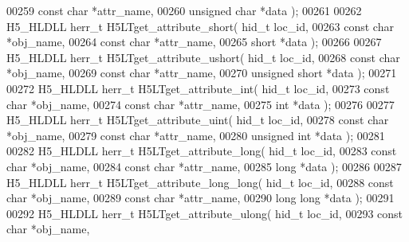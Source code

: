 \begin{DoxyCode}
00259                                \textcolor{keyword}{const} \textcolor{keywordtype}{char} *attr\_name,
00260                                \textcolor{keywordtype}{unsigned} \textcolor{keywordtype}{char} *data );
00261 
00262 H5\_HLDLL herr\_t  H5LTget\_attribute\_short( hid\_t loc\_id,
00263                                 \textcolor{keyword}{const} \textcolor{keywordtype}{char} *obj\_name,
00264                                 \textcolor{keyword}{const} \textcolor{keywordtype}{char} *attr\_name,
00265                                 \textcolor{keywordtype}{short} *data );
00266 
00267 H5\_HLDLL herr\_t  H5LTget\_attribute\_ushort( hid\_t loc\_id,
00268                                 \textcolor{keyword}{const} \textcolor{keywordtype}{char} *obj\_name,
00269                                 \textcolor{keyword}{const} \textcolor{keywordtype}{char} *attr\_name,
00270                                 \textcolor{keywordtype}{unsigned} \textcolor{keywordtype}{short} *data );
00271 
00272 H5\_HLDLL herr\_t  H5LTget\_attribute\_int( hid\_t loc\_id,
00273                               \textcolor{keyword}{const} \textcolor{keywordtype}{char} *obj\_name,
00274                               \textcolor{keyword}{const} \textcolor{keywordtype}{char} *attr\_name,
00275                               \textcolor{keywordtype}{int} *data );
00276 
00277 H5\_HLDLL herr\_t  H5LTget\_attribute\_uint( hid\_t loc\_id,
00278                               \textcolor{keyword}{const} \textcolor{keywordtype}{char} *obj\_name,
00279                               \textcolor{keyword}{const} \textcolor{keywordtype}{char} *attr\_name,
00280                               \textcolor{keywordtype}{unsigned} \textcolor{keywordtype}{int} *data );
00281 
00282 H5\_HLDLL herr\_t  H5LTget\_attribute\_long( hid\_t loc\_id,
00283                                \textcolor{keyword}{const} \textcolor{keywordtype}{char} *obj\_name,
00284                                \textcolor{keyword}{const} \textcolor{keywordtype}{char} *attr\_name,
00285                                \textcolor{keywordtype}{long} *data );
00286 
00287 H5\_HLDLL herr\_t  H5LTget\_attribute\_long\_long( hid\_t loc\_id,
00288                                \textcolor{keyword}{const} \textcolor{keywordtype}{char} *obj\_name,
00289                                \textcolor{keyword}{const} \textcolor{keywordtype}{char} *attr\_name,
00290                                \textcolor{keywordtype}{long} \textcolor{keywordtype}{long} *data );
00291 
00292 H5\_HLDLL herr\_t  H5LTget\_attribute\_ulong( hid\_t loc\_id,
00293                                \textcolor{keyword}{const} \textcolor{keywordtype}{char} *obj\_name,

\end{DoxyCode}
